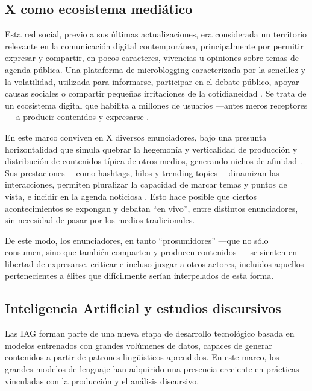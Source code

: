 \documentclass[spanish]{textolivre}
\begin{document}
\subsection{X como ecosistema mediático}\label{sec-organizacao}
Esta red social, previo a sus últimas actualizaciones, era considerada un territorio relevante en la comunicación digital contemporánea, principalmente por permitir expresar y compartir, en pocos caracteres, vivencias u opiniones sobre temas de agenda pública. Una plataforma de microblogging caracterizada por la sencillez y la volatilidad, utilizada para informarse, participar en el debate público, apoyar causas sociales o compartir pequeñas irritaciones de la cotidianeidad \cite{zappavigna2012discourse}. Se trata de un ecosistema digital que habilita a millones de usuarios —antes meros receptores— a producir contenidos y expresarse \cite{buckingham2005educacion}.

En este marco conviven en X diversos enunciadores, bajo una presunta horizontalidad que simula quebrar la hegemonía y verticalidad de producción y distribución de contenidos típica de otros medios, generando nichos de afinidad \cite{aparici2018prosumidores}. Sus prestaciones —como hashtags, hilos y trending topics— dinamizan las interacciones, permiten pluralizar la capacidad de marcar temas y puntos de vista, e incidir en la agenda noticiosa \cite{martinezfresneda2021agenda}. Esto hace posible que ciertos acontecimientos se expongan y debatan “en vivo”, entre distintos enunciadores, sin necesidad de pasar por los medios tradicionales.

De este modo, los enunciadores, en tanto “prosumidores” —que no sólo consumen, sino que también comparten y producen contenidos \cite{buckingham2005educacion}— se sienten en libertad de expresarse, criticar e incluso juzgar a otros actores, incluidos aquellos pertenecientes a élites que difícilmente serían interpelados de esta forma.

\subsection{Inteligencia Artificial y estudios discursivos}\label{sec-organizacao-latex}
Las IAG forman parte de una nueva etapa de desarrollo tecnológico basada en modelos entrenados con grandes volúmenes de datos, capaces de generar contenidos a partir de patrones lingüísticos aprendidos. En este marco, los grandes modelos de lenguaje han adquirido una presencia creciente en prácticas vinculadas con la producción y el análisis discursivo.
\end{document}
